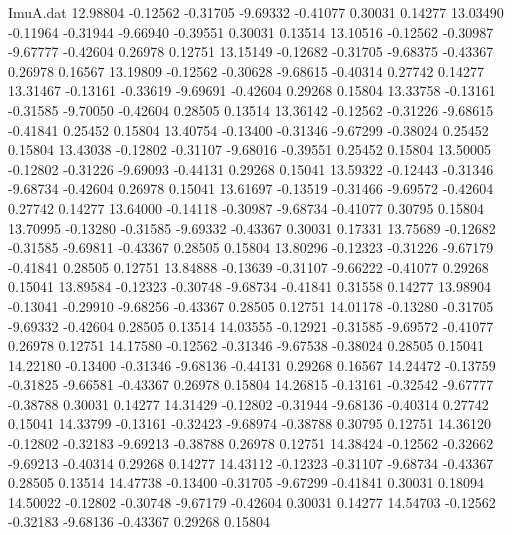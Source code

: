 \begin{filecontents}{ImuA.dat}
  12.98804   -0.12562   -0.31705   -9.69332   -0.41077    0.30031    0.14277
  13.03490   -0.11964   -0.31944   -9.66940   -0.39551    0.30031    0.13514
  13.10516   -0.12562   -0.30987   -9.67777   -0.42604    0.26978    0.12751
  13.15149   -0.12682   -0.31705   -9.68375   -0.43367    0.26978    0.16567
  13.19809   -0.12562   -0.30628   -9.68615   -0.40314    0.27742    0.14277
  13.31467   -0.13161   -0.33619   -9.69691   -0.42604    0.29268    0.15804
  13.33758   -0.13161   -0.31585   -9.70050   -0.42604    0.28505    0.13514
  13.36142   -0.12562   -0.31226   -9.68615   -0.41841    0.25452    0.15804
  13.40754   -0.13400   -0.31346   -9.67299   -0.38024    0.25452    0.15804
  13.43038   -0.12802   -0.31107   -9.68016   -0.39551    0.25452    0.15804
  13.50005   -0.12802   -0.31226   -9.69093   -0.44131    0.29268    0.15041
  13.59322   -0.12443   -0.31346   -9.68734   -0.42604    0.26978    0.15041
  13.61697   -0.13519   -0.31466   -9.69572   -0.42604    0.27742    0.14277
  13.64000   -0.14118   -0.30987   -9.68734   -0.41077    0.30795    0.15804
  13.70995   -0.13280   -0.31585   -9.69332   -0.43367    0.30031    0.17331
  13.75689   -0.12682   -0.31585   -9.69811   -0.43367    0.28505    0.15804
  13.80296   -0.12323   -0.31226   -9.67179   -0.41841    0.28505    0.12751
  13.84888   -0.13639   -0.31107   -9.66222   -0.41077    0.29268    0.15041
  13.89584   -0.12323   -0.30748   -9.68734   -0.41841    0.31558    0.14277
  13.98904   -0.13041   -0.29910   -9.68256   -0.43367    0.28505    0.12751
  14.01178   -0.13280   -0.31705   -9.69332   -0.42604    0.28505    0.13514
  14.03555   -0.12921   -0.31585   -9.69572   -0.41077    0.26978    0.12751
  14.17580   -0.12562   -0.31346   -9.67538   -0.38024    0.28505    0.15041
  14.22180   -0.13400   -0.31346   -9.68136   -0.44131    0.29268    0.16567
  14.24472   -0.13759   -0.31825   -9.66581   -0.43367    0.26978    0.15804
  14.26815   -0.13161   -0.32542   -9.67777   -0.38788    0.30031    0.14277
  14.31429   -0.12802   -0.31944   -9.68136   -0.40314    0.27742    0.15041
  14.33799   -0.13161   -0.32423   -9.68974   -0.38788    0.30795    0.12751
  14.36120   -0.12802   -0.32183   -9.69213   -0.38788    0.26978    0.12751
  14.38424   -0.12562   -0.32662   -9.69213   -0.40314    0.29268    0.14277
  14.43112   -0.12323   -0.31107   -9.68734   -0.43367    0.28505    0.13514
  14.47738   -0.13400   -0.31705   -9.67299   -0.41841    0.30031    0.18094
  14.50022   -0.12802   -0.30748   -9.67179   -0.42604    0.30031    0.14277
  14.54703   -0.12562   -0.32183   -9.68136   -0.43367    0.29268    0.15804

\end{filecontents}

